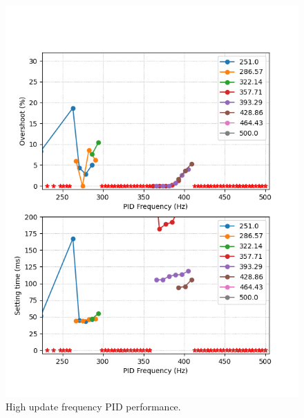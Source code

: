 \documentclass[conference]{IEEEtran}
\begin{document}
        \begin{figure}
            \centering
            \includegraphics[width=\linewidth]{Report/Pic/ResultHighFrequency_2.png}
            \caption{High update frequency PID performance.}
            \label{fig_HighFrequency}
        \end{figure}
\end{document}

